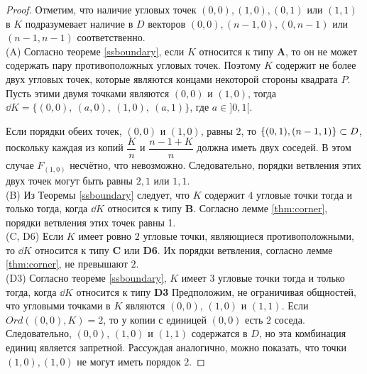 \begin{proof}

Отметим, что наличие угловых точек $(0,0), (1,0), (0,1)$ или $(1,1)$ в $K$ подразумевает наличие в $D$  векторов $(0,0), (n-1,0), (0,n-1)$ или $(n-1,n-1)$ соответственно.
\\

(A) Согласно теореме \ref{ssboundary}, если $K$ относится к типу {\bf A}, то он не может содержать пару противоположных угловых точек. 
Поэтому $K$ содержит не более двух угловых точек, которые являются концами некоторой стороны квадрата $P$. 
Пусть этими двумя точками являются $(0,0)$ и $(1,0)$, тогда $\dd K=\{(0,0),\ (a,0),\ (1,0),\ (a,1)\}$, где $a\in]0,1[$. 

Если порядки обеих точек, $(0,0)$ и $(1,0)$,  равны $2$, то $\{(0,1), (n-1,1)\}\subset D$, поскольку каждая из копий $\dfrac{K}{n}$ и $\dfrac{n-1+K}{n}$ должна иметь двух соседей. 
В этом случае $F_{(1,0)}$ несчётно, что невозможно.
Следовательно, порядки ветвления этих двух точек могут быть равны $2,1$ или $1,1$.\\

(B) Из Теоремы \ref{ssboundary} следует, что $K$ содержит $4$ угловые точки тогда и только тогда, когда $\dd K$ относится к типу {\bf B}.
Согласно лемме \ref{thm:corner}, порядки ветвления этих точек равны 1.\\

(C, D6) Если $K$ имеет ровно $2$ угловые точки, являющиеся противоположными, то $\dd K$ относится к типу {\bf C} или {\bf D6}.
Их порядки ветвления, согласно лемме \ref{thm:corner}, не превышают $2$. \\

(D3) Согласно теореме \ref{ssboundary}, $K$ имеет $3$ угловые точки тогда и только тогда, когда $\dd K$ относится к типу {\bf D3}
Предположим, не ограничивая общностей, что угловыми точками в $K$ являются $(0,0)$, $(1,0)$ и $(1,1)$. 
Если $Ord((0,0),K)=2$, то у копии с единицей $(0,0)$ есть $2$ соседа. 
Следовательно, $(0,0)$, $(1,0)$ и $(1,1)$ содержатся в  $D$, но эта комбинация единиц является запретной.
Рассуждая аналогично, можно показать, что точки $(1,0),(1,0)$ не могут иметь порядок $2$. 
\end{proof} 


